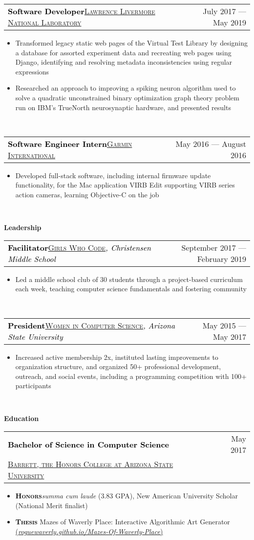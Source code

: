 \documentclass[letterpaper,11pt]{article}
\makeatletter
\newcommand{\boldsc}[1]{\textcolor{black}{\textbf{\textsc{#1}}}}
\newcommand{\resumeSpacing}{5pt}
\newcommand{\resumeSection}[1]{
  \begin{flushleft}
  {\LARGE
  \textcolor{accent}{\textbf{#1}}
  \hrulefill}
  \end{flushleft}
}
\newcommand{\resumeSubsection}[5]{
  \begin{center}
	\begin{tabular*}{\textwidth}{l@{\extracolsep{\fill}}r}
	\large\textcolor{black}{\textbf{#1}}\normalsize\textcolor{black}{\quad\href{#4}{\textsc{#3}}\textit{#5}} & \small\textcolor{accent}{#2} \\
	\end{tabular*}
  \vspace{-\resumeSpacing}
  \vspace{-\resumeSpacing}
  \end{center}
}
\newcommand{\resumeSubsectionTwo}[5]{
  \begin{center}
	\begin{tabular*}{\textwidth}{l@{\extracolsep{\fill}}r}
	\large\textcolor{black}{\textbf{#1}} & \small\textcolor{accent}{#2} \\
  \textcolor{black}{\href{#4}{\textsc{#3}}\textit{#5}} & \\
	\end{tabular*}
  \vspace{-\resumeSpacing}
  \end{center}
}
\newenvironment{resumeItemize}{
  \addtolength{\leftmargini}{-\resumeSpacing}
  \begin{minipage}{0.99\textwidth}
  \begin{itemize}
  \small
}{
  \end{itemize}
  \vspace{0pt}
  \end{minipage}
  \normalsize
  \ \\
}
\newcommand{\resumeItem}[1]
{
  \raggedright
  \item{#1}
  \vspace{-\resumeSpacing}
}
\makeatother
\begin{document}
  \resumeSubsection
  {Software Developer}{July 2017 --- May 2019}
  {Lawrence Livermore National Laboratory}{https://www.llnl.gov/}{}
  \begin{resumeItemize}
    \resumeItem
    {Transformed legacy static web pages of the Virtual Test Library by designing a database for assorted experiment data and recreating web pages using Django, identifying and resolving metadata inconsistencies using regular expressions}
    \resumeItem
    {Researched an approach to improving a spiking neuron algorithm used to solve a quadratic unconstrained binary optimization graph theory problem run on IBM's TrueNorth neurosynaptic hardware, and presented results}
  \end{resumeItemize}
	\resumeSubsection
  {Software Engineer Intern}{May 2016 --- August 2016}
  {Garmin International}{https://www.garmin.com/}{}
	\begin{resumeItemize}
    \resumeItem
    {Developed full-stack software, including internal firmware update functionality, for the Mac application VIRB Edit supporting VIRB series action cameras, learning Objective-C on the job}
	\end{resumeItemize}
  \resumeSection{Leadership}
  \resumeSubsection
  {Facilitator}{September 2017 --- February 2019}
  {Girls Who Code}{https://girlswhocode.com/}{, Christensen Middle School}
  \begin{resumeItemize}
    \resumeItem
    {Led a middle school club of 30 students through a project-based curriculum each week, teaching computer science fundamentals and fostering community}
  \end{resumeItemize}
  \resumeSubsection
  {President}{May 2015 --- May 2017}
  {Women in Computer Science}{http://wics-asu.org/}{, Arizona State University}
  \begin{resumeItemize}
    \resumeItem
    {Increased active membership 2x, instituted lasting improvements to organization structure, and organized 50+ professional development, outreach, and social events, including a programming competition with 100+ participants}
  \end{resumeItemize}
  \resumeSection{Education}
  \resumeSubsectionTwo
  {Bachelor of Science in Computer Science}{May 2017}
  {Barrett, the Honors College at Arizona State University}{https://barretthonors.asu.edu/}{}
  \begin{resumeItemize}
	  \resumeItem
    {\boldsc{Honors}\space\textit{summa cum laude} (3.83 GPA), New American University Scholar (National Merit finalist)}
	  \resumeItem
    {\boldsc{Thesis} Mazes of Waverly Place: Interactive Algorithmic Art Generator \href{https://roguewaverly.github.io/Mazes-Of-Waverly-Place/}{(\textit{roguewaverly.github.io/Mazes-Of-Waverly-Place})}}
  \end{resumeItemize}
  \vspace{-\resumeSpacing}
\end{document}
